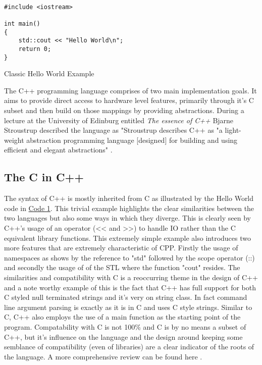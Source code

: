 \documentclass[conference, a4paper]{IEEEtran}
\begin{document}
\begin{listing}[h]

\begin{verbatim}

#include <iostream>

int main()
{
    std::cout << "Hello World\n";
    return 0;
}

\end{verbatim}

\caption{Classic Hello World Example} \label{listing:1}
\end{listing}
The C++ programming language comprises of two main implementation goals. It aims to provide direct access to hardware level features, primarily through it's C subset and then build on those mappings by providing abstractions. During a lecture at the University of Edinburg entitled \textit{The essence of C++} Bjarne Stroustrup described the language as "Stroustrup describes C++ as "a light-weight abstraction programming language [designed] for building and using efficient and elegant abstractions" \cite{EssenceofC++}. 

\subsection{ The C in C++}

The syntax of C++ is mostly inherited from C as illustrated by the Hello World code in \hyperref[listing:1]{Code 1}. This trivial example highlights the clear similarities between the two languages but also some ways in which they diverge. This is clearly seen by C++'s usage of an operator (<< and >>) to handle IO rather than the C equivalent library functions. This extremely simple example also introduces two more features that are extremely characteristic of CPP. Firstly the usage of namespaces as shows by the reference to "std" followed by the scope operator (::) and secondly the usage of of the STL where the function "cout" resides. The similarities and compatibility with C is a reoccurring theme in the design of C++ and a note worthy example of this is the fact that C++ has full support for both C styled null terminated strings and it's very on string class. In fact command line argument parsing is exactly as it is in C and uses C style strings. Similar to C, C++ also employs the use of a main function as the starting point of the program. Compatability with C is not 100\% and C is by no means a subset of C++, but it's influence on the language and the design around keeping some semblance of compatibility (even of libraries) are a clear indicator of the roots of the language. A more comprehensive review can be found here \cite{calder1994quantifying}.
\end{document}
